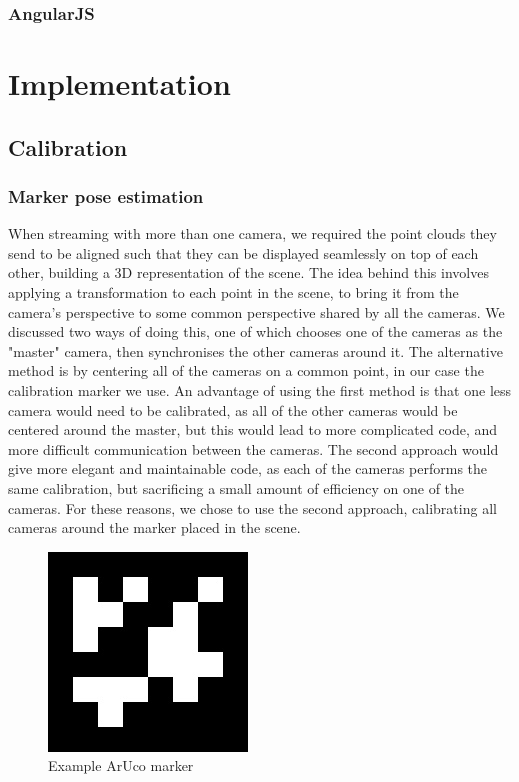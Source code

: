 \documentclass{article}
\begin{document}
\subsubsection{AngularJS}

\newpage
\section{Implementation}
\subsection{Calibration}
\subsubsection{Marker pose estimation}
When streaming with more than one camera, we required the point clouds they send to be aligned such that they can be displayed seamlessly on top of each other, building a 3D representation of the scene. The idea behind this involves applying a transformation to each point in the scene, to bring it from the camera's perspective to some common perspective shared by all the cameras. We discussed two ways of doing this, one of which chooses one of the cameras as the "master" camera, then synchronises the other cameras around it. The alternative method is by centering all of the cameras on a common point, in our case the calibration marker we use. An advantage of using the first method is that one less camera would need to be calibrated, as all of the other cameras would be centered around the master, but this would lead to more complicated code, and more difficult communication between the cameras. The second approach would give more elegant and maintainable code, as each of the cameras performs the same calibration, but sacrificing a small amount of efficiency on one of the cameras. For these reasons, we chose to use the second approach, calibrating all cameras around the marker placed in the scene. \\
\begin{figure}[h]
  \centering
  \includegraphics[scale=0.6]{aruco}
  \caption{Example ArUco marker}
\end{figure} \\
\end{document}
